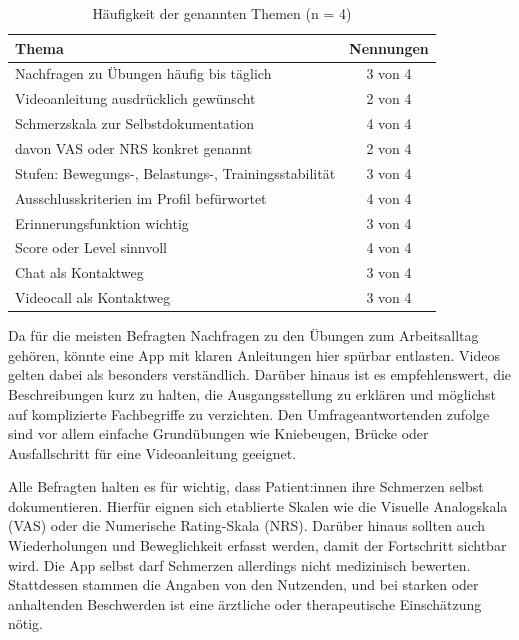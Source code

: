 \begin{table}[H]
    \centering
    \begin{tabular}{lc}
        \hline
        \textbf{Thema} & \textbf{Nennungen} \\
        \hline
        Nachfragen zu Übungen häufig bis täglich       & 3 von 4 \\
        Videoanleitung ausdrücklich gewünscht          & 2 von 4 \\
        Schmerzskala zur Selbstdokumentation           & 4 von 4 \\
        \quad davon VAS oder NRS konkret genannt       & 2 von 4 \\
        Stufen: Bewegungs-, Belastungs-, Trainingsstabilität & 3 von 4 \\
        Ausschlusskriterien im Profil befürwortet      & 4 von 4 \\
        Erinnerungsfunktion wichtig                    & 3 von 4 \\
        Score oder Level sinnvoll                      & 4 von 4 \\
        Chat als Kontaktweg                            & 3 von 4 \\
        Videocall als Kontaktweg                       & 3 von 4 \\
        \hline
    \end{tabular}
    \caption{Häufigkeit der genannten Themen (n = 4)}
    \label{tab:befragung_physio}
\end{table}

Da für die meisten Befragten Nachfragen zu den Übungen zum Arbeitsalltag gehören, könnte eine App mit klaren Anleitungen hier spürbar entlasten. Videos gelten dabei als besonders verständlich. Darüber hinaus ist es empfehlenswert, die Beschreibungen kurz zu halten, die Ausgangsstellung zu erklären und möglichst auf komplizierte Fachbegriffe zu verzichten. Den Umfrageantwortenden zufolge sind vor allem einfache Grundübungen wie Kniebeugen, Brücke oder Ausfallschritt für eine Videoanleitung geeignet.

Alle Befragten halten es für wichtig, dass Patient:innen ihre Schmerzen selbst dokumentieren. Hierfür eignen sich etablierte Skalen wie die Visuelle Analogskala (VAS) oder die Numerische Rating-Skala (NRS). Darüber hinaus sollten auch Wiederholungen und Beweglichkeit erfasst werden, damit der Fortschritt sichtbar wird. Die App selbst darf Schmerzen allerdings nicht medizinisch bewerten. Stattdessen stammen die Angaben von den Nutzenden, und bei starken oder anhaltenden Beschwerden ist eine ärztliche oder therapeutische Einschätzung nötig.

